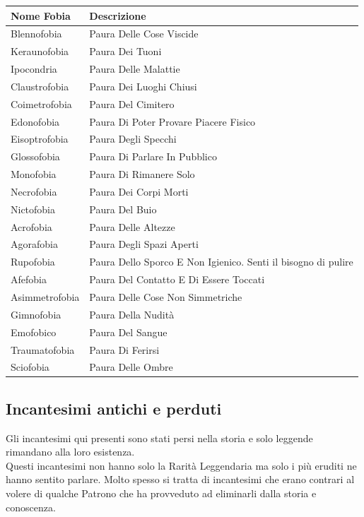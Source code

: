 \documentclass[a4paper,twoside,openany]{book}
\begin{document}
\begin{tabular}{ll}
\textbf{Nome Fobia} & \textbf{Descrizione}\\
\toprule
Blennofobia & Paura Delle Cose Viscide\\
Keraunofobia  & Paura Dei Tuoni\\
Ipocondria  & Paura Delle Malattie\\
Claustrofobia & Paura Dei Luoghi Chiusi\\
Coimetrofobia & Paura Del Cimitero\\
Edonofobia  & Paura Di Poter Provare Piacere Fisico\\
Eisoptrofobia & Paura Degli Specchi\\
Glossofobia & Paura Di Parlare In Pubblico\\
Monofobia & Paura Di Rimanere Solo\\
Necrofobia  & Paura Dei Corpi Morti\\
Nictofobia  & Paura Del Buio\\
Acrofobia & Paura Delle Altezze\\
Agorafobia  & Paura Degli Spazi Aperti\\
Rupofobia & Paura Dello Sporco E Non Igienico. Senti il bisogno di pulire\\
Afefobia  & Paura Del Contatto E Di Essere Toccati\\
Asimmetrofobia  & Paura Delle Cose Non Simmetriche\\
Gimnofobia  & Paura Della Nudità\\
Emofobico & Paura Del Sangue\\
Traumatofobia & Paura Di Ferirsi\\
Sciofobia & Paura Delle Ombre\\
\end{tabular}

\pagebreak

\subsection{Incantesimi antichi e perduti}

Gli incantesimi qui presenti sono stati persi nella storia e solo leggende rimandano alla loro esistenza.\\
Questi incantesimi non hanno solo la Rarità Leggendaria ma solo i più eruditi ne hanno sentito parlare. Molto spesso si tratta di incantesimi che erano contrari al volere di qualche Patrono che ha provveduto ad eliminarli dalla storia e conoscenza.
\end{document}
